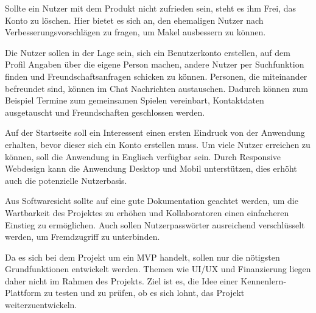 Sollte ein Nutzer mit dem Produkt nicht zufrieden sein, steht es ihm Frei, das Konto zu löschen.
Hier bietet es sich an, den ehemaligen Nutzer nach Verbesserungsvorschlägen zu fragen, um Makel ausbessern zu können.

Die Nutzer sollen in der Lage sein, sich ein Benutzerkonto erstellen, auf dem Profil Angaben über die eigene Person machen, andere Nutzer per Suchfunktion finden und Freundschaftsanfragen schicken zu können.
Personen, die miteinander befreundet sind, können im Chat Nachrichten austauschen.
Dadurch können zum Beispiel Termine zum gemeinsamen Spielen vereinbart, Kontaktdaten ausgetauscht und Freundschaften geschlossen werden.

Auf der Startseite soll ein Interessent einen ersten Eindruck von der Anwendung erhalten, bevor dieser sich ein Konto erstellen muss.
Um viele Nutzer erreichen zu können, soll die Anwendung in Englisch verfügbar sein.
Durch Responsive Webdesign %
kann die Anwendung Desktop und Mobil unterstützen, dies erhöht auch die potenzielle Nutzerbasis.

Aus Softwaresicht sollte auf eine gute Dokumentation geachtet werden, um die Wartbarkeit des Projektes zu erhöhen und Kollaboratoren einen einfacheren Einstieg zu ermöglichen.
Auch sollen Nutzerpasswörter ausreichend verschlüsselt werden, um Fremdzugriff zu unterbinden.

Da es sich bei dem Projekt um ein MVP handelt, sollen nur die nötigsten Grundfunktionen entwickelt werden.
Themen wie UI/UX und Finanzierung liegen daher nicht im Rahmen des Projekts.
Ziel ist es, die Idee einer Kennenlern-Plattform zu testen und zu prüfen, ob es sich lohnt, das Projekt weiterzuentwickeln. 